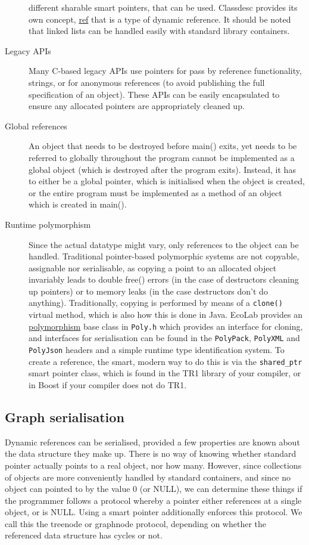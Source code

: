 \begin{description}
  different sharable smart pointers, that can be used. Classdesc
  provides its own concept, \hyperref{{\tt ref}}{ (see \S}{)}{ref} that
  is a type of dynamic reference.  It should be noted that linked
  lists can be handled easily with standard library containers.
\item[Legacy APIs] Many C-based legacy APIs use pointers for pass by
  reference functionality, strings, or for anonymous references (to
  avoid publishing the full specification of an object). These APIs
  can be easily encapsulated to ensure any allocated pointers are
  appropriately cleaned up.
\item[Global references] An object that needs to be destroyed before
  main() exits, yet needs to be referred to globally throughout the
  program cannot be implemented as a global object (which is destroyed
  after the program exits). Instead, it has to either be a global
  pointer, which is initialised when the object is created, or the
  entire program must be implemented as a method of an object which is
  created in main().
\item [Runtime polymorphism] Since the actual datatype might vary,
  only references to the object can be handled. Traditional
  pointer-based polymorphic systems are not copyable, assignable nor
  serialisable, as copying a point to an allocated object invariably
  leads to double free() errors (in the case of destructors cleaning
  up pointers) or to memory leaks (in the case destructors don't do
  anything). Traditionally, copying is performed by means of a
  \verb+clone()+ virtual method, which is also how this is done in
  Java. EcoLab provides an  \hyperref{PolyBase}{ (see
    \S}{)}{polymorphism} base class in \verb+Poly.h+ which
  provides an interface for cloning, and interfaces for serialisation
  can be found in the \verb+PolyPack+, \verb+PolyXML+ and
  \verb+PolyJson+ headers and a simple
  runtime type identification system. To create a reference, the
  smart, modern way to do this is via the \verb+shared_ptr+ smart
  pointer class, which is found in the TR1 library of your compiler,
  or in Boost if your compiler does not do TR1.
\end{description}

\subsection{Graph serialisation}

Dynamic references can be serialised, provided a few properties are
known about the data structure they make up. There is no way of
knowing whether standard pointer actually points to a real object, nor
how many. However, since collections of objects are more conveniently
handled by standard containers, and since no object can pointed to by
the value 0 (or NULL), we can determine these things if the programmer
follows a protocol whereby a pointer either references at a single
object, or is NULL. Using a smart pointer additionally enforces this
protocol. We call this the treenode or graphnode protocol, depending
on whether the referenced data structure has cycles or not.

